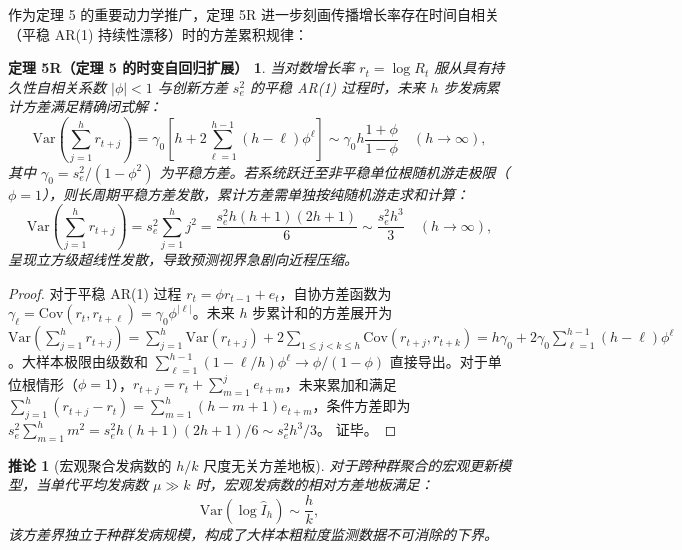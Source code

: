 \documentclass[11pt,a4paper]{article}
\theoremstyle{plain}
\newtheorem*{theorem5R}{定理 5R（定理 5 的时变自回归扩展）}
\newtheorem{corollary}{推论}
\theoremstyle{definition}
\begin{document}
作为定理 5 的重要动力学推广，定理 5R 进一步刻画传播增长率存在时间自相关（平稳 AR(1) 持续性漂移）时的方差累积规律：

\begin{theorem5R}\label{thm:t5r}
当对数增长率 $r_t = \log R_t$ 服从具有持久性自相关系数 $|\phi| < 1$ 与创新方差 $s_e^2$ 的平稳 AR(1) 过程时，未来 $h$ 步发病累计方差满足精确闭式解：
\begin{equation}
\text{Var}\left(\sum_{j=1}^h r_{t+j}\right) = \gamma_0 \left[ h + 2 \sum_{\ell=1}^{h-1} (h-\ell) \phi^\ell \right] \sim \gamma_0 h \frac{1+\phi}{1-\phi} \quad (h \to \infty),
\end{equation}
其中 $\gamma_0 = s_e^2/(1-\phi^2)$ 为平稳方差。若系统跃迁至非平稳单位根随机游走极限（$\phi = 1$），则长周期平稳方差发散，累计方差需单独按纯随机游走求和计算：
\begin{equation}
\text{Var}\left(\sum_{j=1}^h r_{t+j}\right) = s_e^2 \sum_{j=1}^h j^2 = \frac{s_e^2 h(h+1)(2h+1)}{6} \sim \frac{s_e^2 h^3}{3} \quad (h \to \infty),
\end{equation}
呈现立方级超线性发散，导致预测视界急剧向近程压缩。
\end{theorem5R}

\begin{proof}
对于平稳 AR(1) 过程 $r_t = \phi r_{t-1} + e_t$，自协方差函数为 $\gamma_\ell = \text{Cov}(r_t, r_{t+\ell}) = \gamma_0 \phi^{|\ell|}$。未来 $h$ 步累计和的方差展开为 $\text{Var}(\sum_{j=1}^h r_{t+j}) = \sum_{j=1}^h \text{Var}(r_{t+j}) + 2 \sum_{1 \le j < k \le h} \text{Cov}(r_{t+j}, r_{t+k}) = h \gamma_0 + 2 \gamma_0 \sum_{\ell=1}^{h-1} (h-\ell) \phi^\ell$。大样本极限由级数和 $\sum_{\ell=1}^{h-1} (1-\ell/h)\phi^\ell \to \phi/(1-\phi)$ 直接导出。对于单位根情形（$\phi = 1$），$r_{t+j} = r_t + \sum_{m=1}^j e_{t+m}$，未来累加和满足 $\sum_{j=1}^h (r_{t+j} - r_t) = \sum_{m=1}^h (h - m + 1) e_{t+m}$，条件方差即为 $s_e^2 \sum_{m=1}^h m^2 = s_e^2 h(h+1)(2h+1)/6 \sim s_e^2 h^3 / 3$。
证毕。
\end{proof}

\begin{corollary}[宏观聚合发病数的 $h/k$ 尺度无关方差地板]\label{cor:pop_floor}
对于跨种群聚合的宏观更新模型，当单代平均发病数 $\mu \gg k$ 时，宏观发病数的相对方差地板满足：
\begin{equation}
\text{Var}(\log \hat{I}_h) \sim \frac{h}{k},
\label{eq:pop_floor}
\end{equation}
该方差界独立于种群发病规模，构成了大样本粗粒度监测数据不可消除的下界。
\end{corollary}
\end{document}
